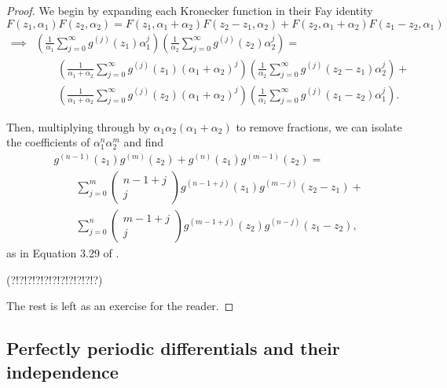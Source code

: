 \begin{proof}
    We begin by expanding each Kronecker function in their Fay identity
    \begin{equation}
        {F}(z_1,\alpha_1){F}(z_2,\alpha_2) = {F}(z_1,\alpha_1+\alpha_2){F}(z_2-z_1,\alpha_2) + {F}(z_2,\alpha_1+\alpha_2){F}(z_1-z_2,\alpha_1)
    \end{equation}
    \begin{align}
        \implies & \left(\frac{1}{\alpha_1} \sum_{j=0}^{\infty} g^{(j)}(z_1) \alpha_1^j\right)
        \left(\frac{1}{\alpha_2} \sum_{j=0}^{\infty} g^{(j)}(z_2) \alpha_2^j\right) =
        \\ & \quad \quad \left(\frac{1}{\alpha_1+\alpha_2} \sum_{j=0}^{\infty} g^{(j)}(z_1) (\alpha_1+\alpha_2)^j\right)
        \left(\frac{1}{\alpha_2} \sum_{j=0}^{\infty} g^{(j)}(z_2-z_1) \alpha_2^j\right) +
        \\ & \quad \quad \left(\frac{1}{\alpha_1+\alpha_2} \sum_{j=0}^{\infty} g^{(j)}(z_2) (\alpha_1+\alpha_2)^j\right)
        \left(\frac{1}{\alpha_1} \sum_{j=0}^{\infty} g^{(j)}(z_1-z_2) \alpha_1^j\right).
    \end{align}

    Then, multiplying through by $\alpha_1\alpha_2(\alpha_1+\alpha_2)$ to remove fractions, we can isolate the coefficients of $\alpha_1^n \alpha_2^m$ and find
    \begin{align}
        & g^{(n-1)}(z_1)g^{(m)}(z_2)+g^{(n)}(z_1)g^{(m-1)}(z_2) =
        \\ & \quad \quad \sum_{j=0}^{m} \begin{pmatrix} n-1+j \\ j \end{pmatrix} g^{(n-1+j)}(z_1) g^{(m-j)}(z_2-z_1) +
        \\ & \quad \quad \sum_{j=0}^{n} \begin{pmatrix} m-1+j \\ j \end{pmatrix} g^{(m-1+j)}(z_2) g^{(n-j)}(z_1-z_2),
    \end{align}
    as in Equation 3.29 of \cite{Broedel_2015}.

    (?!?!?!?!?!?!?!?!?!?!?)

    The rest is left as an exercise for the reader.
\end{proof}

\subsection{Perfectly periodic differentials and their independence}


